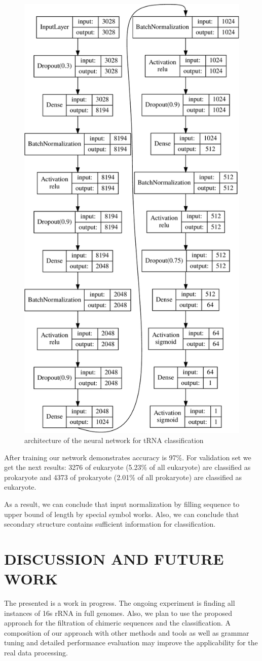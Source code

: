 \documentclass[a4paper,twoside]{article}
\begin{document}
\begin{figure}
\centering
\includegraphics[width=.4\textwidth]{figures/model-crop.pdf}
\caption{architecture of the neural network for tRNA classification}
\label{fig:nn}
\end{figure}

After training our network demonstrates accuracy is 97\%. 
For validation set we get the next results: 3276 of eukaryote (5.23\% of all eukaryote) are classified as prokaryote and 4373 of prokaryote (2.01\% of all prokaryote) are classified as eukaryote. 

As a result, we can conclude that input normalization by filling sequence to upper bound of length by special symbol works.
Also, we can conclude that secondary structure contains sufficient information for classification.


\section{\uppercase{Discussion and Future Work}}
\label{sec:Discussion}

\noindent The presented is a work in progress. 
The ongoing experiment is finding all instances of 16s rRNA in full genomes.
Also, we plan to use the proposed approach for the filtration of chimeric sequences and the classification.
A composition of our approach with other methods and tools as well as grammar tuning and detailed performance evaluation may improve the applicability for the real data processing.
\end{document}
